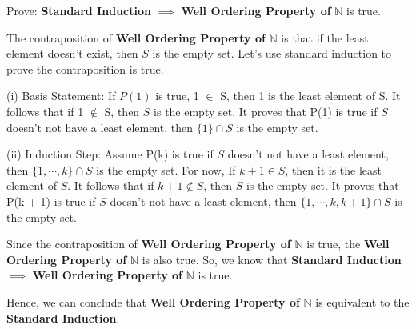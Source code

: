 \begin{flushleft}
Prove: \textbf{Standard Induction} $\implies$ \textbf{Well Ordering Property 
of} $\mathbb{N}$ is true. \\
\vspace{10px}

The contraposition of \textbf{Well Ordering Property of} $\mathbb{N}$ is
that if the least element doesn't exist, then $S$ is the empty set. 
Let's use standard induction to prove the contraposition is true. \\
\vspace{10px}

(i) Basis Statement: If $P(1)$ is true, 1 $\in$ S, then 1 is the least element 
of S. It follows that if 1 $\notin$ S, then $S$ is the empty set. It proves 
that P(1) is true if $S$ doesn't not have a least element, then $\{1\} \cap S$ 
is the empty set.\\
\vspace{10px}

(ii) Induction Step: 
Assume P(k) is true if $S$ doesn't not have a least element, then $\{1, \cdots, 
k\} \cap S$ is the empty set. For now, If $k + 1 \in S$, then it is the least 
element of $S$. It follows that if $k + 1 \notin S$, then $S$ is the empty set. 
It proves that P(k + 1) is true if $S$ doesn't not have a least element, then 
$\{1, \cdots, k, k + 1\} \cap S$ is the empty set.\\
\vspace{10px}
 
Since the contraposition of \textbf{Well Ordering Property of} $\mathbb{N}$ is 
true, the \textbf{Well Ordering Property of} $\mathbb{N}$ is also true. So, we 
know that \textbf{Standard Induction} $\implies$ \textbf{Well Ordering Property 
of} $\mathbb{N}$ is true. 
\end{flushleft}

\begin{flushleft}
Hence, we can conclude that \textbf{Well Ordering Property of} $\mathbb{N}$ is 
equivalent to the \textbf{Standard Induction}. \\
\end{flushleft}

